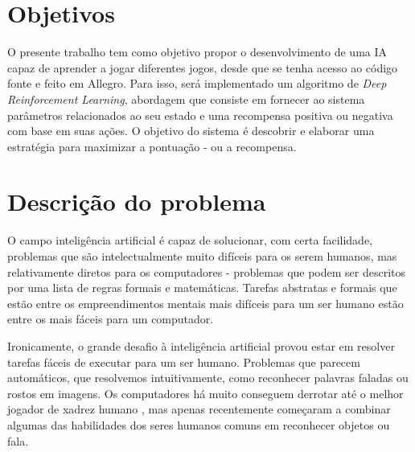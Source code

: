 \section{Objetivos}
 O presente trabalho tem como objetivo propor o desenvolvimento de uma IA capaz de aprender a jogar diferentes jogos, desde que se tenha acesso ao código fonte e feito em Allegro. Para isso, será implementado um algoritmo de \textit{Deep Reinforcement Learning}, abordagem que consiste em fornecer ao sistema parâmetros relacionados ao seu estado e uma recompensa positiva ou negativa com base em suas ações. 
 O objetivo do sistema é descobrir e elaborar uma estratégia para maximizar a pontuação - ou a recompensa.



\section{Descrição do problema}
O campo inteligência artificial é capaz de solucionar, com certa facilidade, problemas que são intelectualmente muito difíceis para os serem humanos, mas relativamente diretos para os computadores - problemas que podem ser descritos por uma lista de regras formais e matemáticas. Tarefas abstratas e formais que estão entre os empreendimentos mentais mais difíceis para um ser humano estão entre os mais fáceis para um computador.

Ironicamente, o grande desafio à inteligência artificial provou estar em resolver tarefas fáceis de executar para um ser humano. Problemas  que parecem automáticos, que resolvemos intuitivamente, como reconhecer palavras faladas ou rostos em imagens. Os computadores há muito conseguem derrotar até o melhor jogador de xadrez humano \cite{Hsu:2002:BDB:601291}, mas apenas recentemente começaram a combinar algumas das habilidades dos seres humanos comuns em reconhecer objetos ou fala. 

